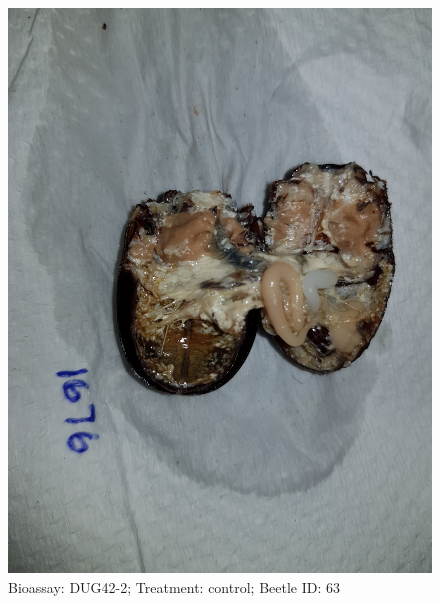 \documentclass[11pt]{scrartcl}
\begin{document}
\begin{figure}[h!]
    \centering
    \includegraphics[width=\linewidth, height=\textheight, keepaspectratio]{uploads/btl.pm_image.aa4294f1fcd4bfab.447567343220313637365f5265702d322020636f6e74726f6c2e6a7067.jpg}
    \caption{Bioassay: DUG42-2; Treatment: control; Beetle ID: 63}
\end{figure}
\clearpage
\end{document}
